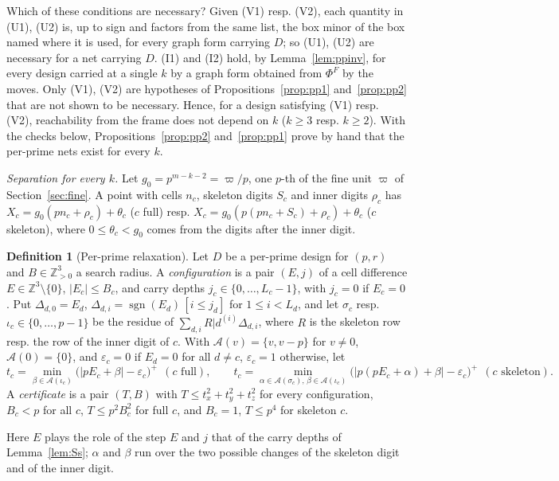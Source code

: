 \documentclass[11pt]{amsart}
\theoremstyle{definition}
\newtheorem{definition}[theorem]{Definition}
\theoremstyle{plain}
\newcommand{\Z}{\mathbb{Z}}
\DeclareMathOperator{\sgn}{sgn}
\begin{document}
Which of these conditions are necessary? Given (V1) resp. (V2), each quantity in (U1), (U2) is, up to sign and factors from the same list, the box minor of the box named where it is used, for every graph form carrying $D$; so (U1), (U2) are necessary for a net carrying $D$. (I1) and (I2) hold, by Lemma~\ref{lem:ppinv}, for every design carried at a single $k$ by a graph form obtained from $\Phi^F$ by the moves. Only (V1), (V2) are hypotheses of Propositions~\ref{prop:pp1} and~\ref{prop:pp2} that are not shown to be necessary. Hence, for a design satisfying (V1) resp. (V2), reachability from the frame does not depend on $k$ ($k\ge3$ resp. $k\ge2$). With the checks below, Propositions~\ref{prop:pp2} and~\ref{prop:pp1} prove by hand that the per-prime nets exist for every $k$.

\smallskip\noindent\emph{Separation for every $k$.} Let $g_0=p^{m-k-2}=\varpi/p$, one $p$-th of the fine unit $\varpi$ of Section~\ref{sec:fine}. A point with cells $n_c$, skeleton digits $S_c$ and inner digits $\rho_c$ has $X_c=g_0(pn_c+\rho_c)+\theta_c$ ($c$ full) resp. $X_c=g_0(p(pn_c+S_c)+\rho_c)+\theta_c$ ($c$ skeleton), where $0\le\theta_c<g_0$ comes from the digits after the inner digit.

\begin{definition}[Per-prime relaxation]\label{def:pprelax}
Let $D$ be a per-prime design for $(p,r)$ and $B\in\Z_{>0}^3$ a search radius. A \emph{configuration} is a pair $(E,j)$ of a cell difference $E\in\Z^3\setminus\{0\}$, $|E_c|\le B_c$, and carry depths $j_c\in\{0,\dots,L_c-1\}$, with $j_c=0$ if $E_c=0$. Put $\Delta_{d,0}=E_d$, $\Delta_{d,i}=\sgn(E_d)\,[i\le j_d]$ for $1\le i<L_d$, and let $\sigma_c$ resp. $\iota_c\in\{0,\dots,p-1\}$ be the residue of $\sum_{d,i}R|d^{(i)}\Delta_{d,i}$, where $R$ is the skeleton row resp. the row of the inner digit of $c$. With $\mathcal A(v)=\{v,v-p\}$ for $v\ne0$, $\mathcal A(0)=\{0\}$, and $\varepsilon_c=0$ if $E_d=0$ for all $d\ne c$, $\varepsilon_c=1$ otherwise, let
\[
t_c=\min_{\beta\in\mathcal A(\iota_c)}\bigl(|pE_c+\beta|-\varepsilon_c\bigr)^+\ \ (c\text{ full}),\qquad
t_c=\min_{\alpha\in\mathcal A(\sigma_c),\,\beta\in\mathcal A(\iota_c)}\bigl(|p(pE_c+\alpha)+\beta|-\varepsilon_c\bigr)^+\ \ (c\text{ skeleton}).
\]
A \emph{certificate} is a pair $(T,B)$ with $T\le t_x^2+t_y^2+t_z^2$ for every configuration, $B_c<p$ for all $c$, $T\le p^2B_c^2$ for full $c$, and $B_c=1$, $T\le p^4$ for skeleton $c$.
\end{definition}

Here $E$ plays the role of the step $E$ and $j$ that of the carry depths of Lemma~\ref{lem:Ss}; $\alpha$ and $\beta$ run over the two possible changes of the skeleton digit and of the inner digit.
\end{document}
